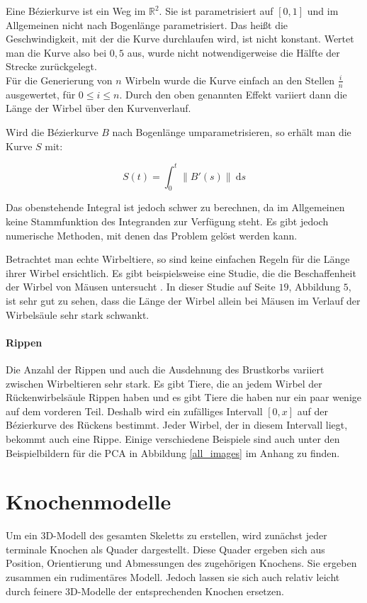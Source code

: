 Eine Bézierkurve ist ein Weg im $\mathbb{R}^2$. Sie ist parametrisiert auf $[0, 1]$ und im Allgemeinen nicht nach Bogenlänge parametrisiert. Das heißt die Geschwindigkeit, mit der die Kurve durchlaufen wird, ist nicht konstant. Wertet man die Kurve also bei $0,5$ aus, wurde nicht notwendigerweise die Hälfte der Strecke zurückgelegt.\\
Für die Generierung von $n$ Wirbeln wurde die Kurve einfach an den Stellen $\frac{i}{n}$ ausgewertet, für $0 \leq i \leq n$. Durch den oben genannten Effekt variiert dann die Länge der Wirbel über den Kurvenverlauf.

Wird die Bézierkurve $B$ nach Bogenlänge umparametrisieren, so erhält man die Kurve $S$ mit:

\[S(t) = \int_0^t \| B'(s) \| ~\mathrm{d}s \]

Das obenstehende Integral ist jedoch schwer zu berechnen, da im Allgemeinen keine Stammfunktion des Integranden zur Verfügung steht. Es gibt jedoch numerische Methoden, mit denen das Problem gelöst werden kann. \cite{ArcLengthParametrization}

Betrachtet man echte Wirbeltiere, so sind keine einfachen Regeln für die Länge ihrer Wirbel ersichtlich. Es gibt beispielsweise eine Studie, die die Beschaffenheit der  Wirbel von Mäusen untersucht \cite{MouseVertebrae}. In dieser Studie auf Seite $19$, Abbildung $5$, ist sehr gut zu sehen, dass die Länge der Wirbel allein bei Mäusen im Verlauf der Wirbelsäule sehr stark schwankt.

\paragraph{Rippen}
Die Anzahl der Rippen und auch die Ausdehnung des Brustkorbs variiert zwischen Wirbeltieren sehr stark. Es gibt Tiere, die an jedem Wirbel der Rückenwirbelsäule Rippen haben und es gibt Tiere die haben nur ein paar wenige auf dem vorderen Teil.
Deshalb wird ein zufälliges Intervall $[0, x]$ auf der Bézierkurve des Rückens bestimmt. Jeder Wirbel, der in diesem Intervall liegt, bekommt auch eine Rippe.
Einige verschiedene Beispiele sind auch unter den Beispielbildern für die PCA in Abbildung \ref{all_images} im Anhang zu finden.


\section{Knochenmodelle}
\label{bone_models}

Um ein 3D-Modell des gesamten Skeletts zu erstellen, wird zunächst jeder terminale Knochen als Quader dargestellt. Diese Quader ergeben sich aus Position, Orientierung und Abmessungen des zugehörigen Knochens. Sie ergeben zusammen ein rudimentäres Modell. Jedoch lassen sie sich auch relativ leicht durch feinere 3D-Modelle der entsprechenden Knochen ersetzen. 

